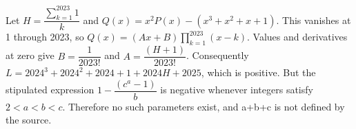 Let $H=\dfrac{\sum_{k=1}^{2023}1}{k}$ and $Q(x)=x^2P(x)-(x^3+x^2+x+1)$. This vanishes at 1 through 2023, so $Q(x)=(Ax+B)\prod_{k=1}^{2023}(x-k)$. Values and derivatives at zero give $B=\dfrac{1}{2023!}$ and $A=\dfrac{(H+1)}{2023!}$. Consequently $L=2024^3+2024^2+2024+1+2024H+2025$, which is positive. But the stipulated expression $1-\dfrac{(c^a-1)}{b}$ is negative whenever integers satisfy $2<a<b<c$. Therefore no such parameters exist, and a+b+c is not defined by the source.
